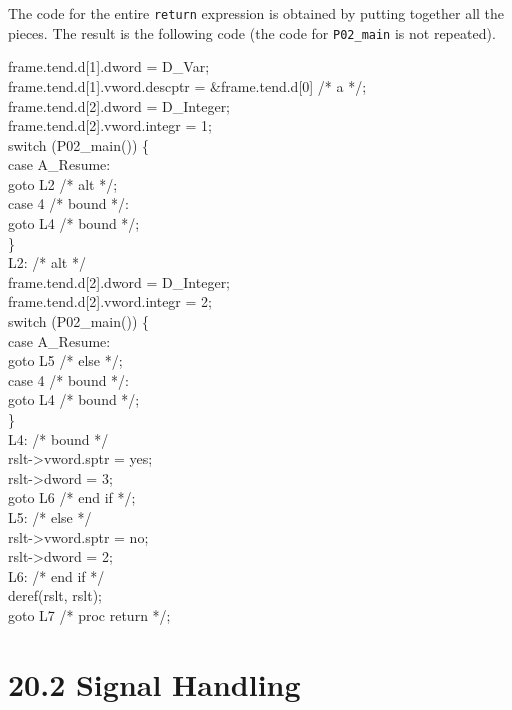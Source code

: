 The code for the entire \texttt{return} expression is obtained by putting
together all the pieces. The result is the following code (the code
for \texttt{P02\_main} is not repeated).

\goodbreak
\begin{iconcode}
frame.tend.d[1].dword = D\_Var;\\
frame.tend.d[1].vword.descptr = \&frame.tend.d[0] /* a */;\\
frame.tend.d[2].dword = D\_Integer;\\
frame.tend.d[2].vword.integr = 1;\\
switch (P02\_main()) \{\\
\>case A\_Resume:\\
\>\>goto L2 /* alt */;\\
\>case 4 /* bound */:\\
\>\>goto L4 /* bound */;\\
\>\}\\
L2: /* alt */\\
\>frame.tend.d[2].dword = D\_Integer;\\
\>frame.tend.d[2].vword.integr = 2;\\
\>switch (P02\_main()) \{\\
\>\>case A\_Resume:\\
\>\>\>goto L5 /* else */;\\
\>\>case 4 /* bound */:\\
\>\>\>goto L4 /* bound */;\\
\>\>\}\\
L4: /* bound */\\
\>rslt->vword.sptr = yes;\\
\>rslt->dword = 3;\\
\>goto L6 /* end if */;\\

L5: /* else */\\
\>rslt->vword.sptr = no;\\
\>rslt->dword = 2;\\
L6: /* end if */\\
\>deref(rslt, rslt);\\
\>goto L7 /* proc return */;\\
\end{iconcode}


\section[20.2 Signal Handling]{20.2 Signal Handling}

